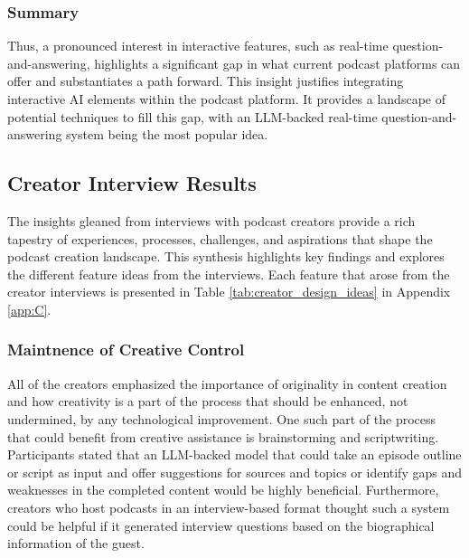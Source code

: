 \documentclass[12pt]{report}
\begin{document}
\begin{myfont}
        \subsubsection{Summary}
        \indent Thus, a pronounced interest in interactive features, such as real-time question-and-answering, highlights a significant gap in what current podcast platforms can offer and substantiates a path forward. This insight justifies integrating interactive AI elements within the podcast platform. It provides a landscape of potential techniques to fill this gap, with an LLM-backed real-time question-and-answering system being the most popular idea.

        \subsection{Creator Interview Results}
        \indent The insights gleaned from interviews with podcast creators provide a rich tapestry of experiences, processes, challenges, and aspirations that shape the podcast creation landscape. This synthesis highlights key findings and explores the different feature ideas from the interviews. Each feature that arose from the creator interviews is presented in Table \ref{tab:creator_design_ideas} in Appendix \ref{app:C}.

        \subsubsection{Maintnence of Creative Control}
        \indent All of the creators emphasized the importance of originality in content creation and how creativity is a part of the process that should be enhanced, not undermined, by any technological improvement. One such part of the process that could benefit from creative assistance is brainstorming and scriptwriting. Participants stated that an LLM-backed model that could take an episode outline or script as input and offer suggestions for sources and topics or identify gaps and weaknesses in the completed content would be highly beneficial. Furthermore, creators who host podcasts in an interview-based format thought such a system could be helpful if it generated interview questions based on the biographical information of the guest.


\end{myfont}
\end{document}
